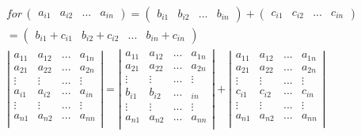 \begin{gather}
    for\,
    \begin{pmatrix}
        a_{i1} & a_{i2} & ... & a_{in}
    \end{pmatrix}
    =\begin{pmatrix}
        b_{i1} & b_{i2} & ... & b_{in}
    \end{pmatrix}
    +\begin{pmatrix}
        c_{i1} & c_{i2} & ... & c_{in}
    \end{pmatrix}\\
    =\begin{pmatrix}
        b_{i1}+c_{i1} & b_{i2}+c_{i2} & ... & b_{in}+c_{in}
    \end{pmatrix}\\
    \left |
    \begin{matrix}
        a_{11} & a_{12} & ... & a_{1n}\\
        a_{21} & a_{22} & ... & a_{2n}\\
        \vdots & \vdots & ... & \vdots\\
        a_{i1} & a_{i2} & ... & a_{in}\\
        \vdots & \vdots & ... & \vdots\\
        a_{n1} & a_{n2} & ... & a_{nn}\\
    \end{matrix}
    \right |
    =    \left |
    \begin{matrix}
        a_{11} & a_{12} & ... & a_{1n}\\
        a_{21} & a_{22} & ... & a_{2n}\\
        \vdots & \vdots & ... & \vdots\\
        b_{i1} & b_{i2} & ... & _{in}\\
        \vdots & \vdots & ... & \vdots\\
        a_{n1} & a_{n2} & ... & a_{nn}\\
    \end{matrix}
    \right |
    +    \left |
    \begin{matrix}
        a_{11} & a_{12} & ... & a_{1n}\\
        a_{21} & a_{22} & ... & a_{2n}\\
        \vdots & \vdots & ... & \vdots\\
        c_{i1} & c_{i2} & ... & c_{in}\\
        \vdots & \vdots & ... & \vdots\\
        a_{n1} & a_{n2} & ... & a_{nn}\\
    \end{matrix}
    \right |
    \label{eq:detAdd}
\end{gather}

